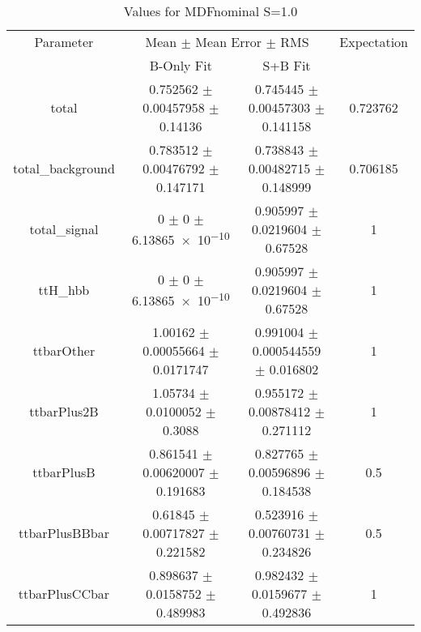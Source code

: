 \begin{table}
\centering
\caption{Values for MDFnominal S=1.0}
\begin{tabular}{cccc}
\toprule
Parameter & \multicolumn{2}{c}{Mean $\pm$ Mean Error $\pm$ RMS} & Expectation\\
 & B-Only Fit & S+B Fit & \\
\midrule
total & \num{0.752562} $\pm$ \num{0.00457958} $\pm$ \num{0.14136} & \num{0.745445} $\pm$ \num{0.00457303} $\pm$ \num{0.141158} & \num{0.723762}\\
total\_background & \num{0.783512} $\pm$ \num{0.00476792} $\pm$ \num{0.147171} & \num{0.738843} $\pm$ \num{0.00482715} $\pm$ \num{0.148999} & \num{0.706185}\\
total\_signal & \num{0} $\pm$ \num{0} $\pm$ \num{6.13865e-10} & \num{0.905997} $\pm$ \num{0.0219604} $\pm$ \num{0.67528} & \num{1}\\
ttH\_hbb & \num{0} $\pm$ \num{0} $\pm$ \num{6.13865e-10} & \num{0.905997} $\pm$ \num{0.0219604} $\pm$ \num{0.67528} & \num{1}\\
ttbarOther & \num{1.00162} $\pm$ \num{0.00055664} $\pm$ \num{0.0171747} & \num{0.991004} $\pm$ \num{0.000544559} $\pm$ \num{0.016802} & \num{1}\\
ttbarPlus2B & \num{1.05734} $\pm$ \num{0.0100052} $\pm$ \num{0.3088} & \num{0.955172} $\pm$ \num{0.00878412} $\pm$ \num{0.271112} & \num{1}\\
ttbarPlusB & \num{0.861541} $\pm$ \num{0.00620007} $\pm$ \num{0.191683} & \num{0.827765} $\pm$ \num{0.00596896} $\pm$ \num{0.184538} & \num{0.5}\\
ttbarPlusBBbar & \num{0.61845} $\pm$ \num{0.00717827} $\pm$ \num{0.221582} & \num{0.523916} $\pm$ \num{0.00760731} $\pm$ \num{0.234826} & \num{0.5}\\
ttbarPlusCCbar & \num{0.898637} $\pm$ \num{0.0158752} $\pm$ \num{0.489983} & \num{0.982432} $\pm$ \num{0.0159677} $\pm$ \num{0.492836} & \num{1}\\
\bottomrule
\end{tabular}
\end{table}